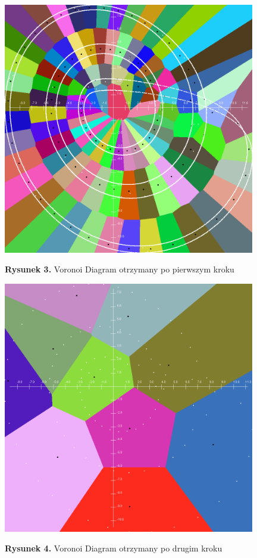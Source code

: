 \documentclass{classrep}
\begin{document}
\begin{center}
	\includegraphics[height=11cm]{mieszany1.png}
	
	
	\textbf{Rysunek 3.} Voronoi Diagram otrzymany po pierwszym kroku
\end{center}

\begin{center}
	\includegraphics[height=11cm]{mieszany2.png}
	
	
	\textbf{Rysunek 4.} Voronoi Diagram otrzymany po drugim kroku
\end{center}
\end{document}
